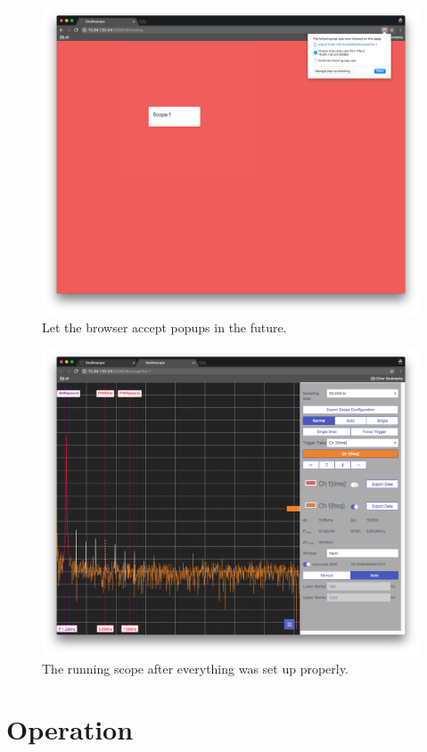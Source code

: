 \begin{figure}
    \centering
    \includegraphics[width=1\textwidth]{images/userguide/popup_yes}
    \caption[Accept popups in the future]{%
        Let the browser accept popups in the future.
    }
    \label{fig:userguide:popup:yes}
\end{figure}

\begin{figure}
    \centering
    \includegraphics[width=1\textwidth]{images/userguide/running}
    \caption[Running the scope]{%
        The running scope after everything was set up properly.
    }
    \label{fig:userguide:running}
\end{figure}

\chapter{Operation} %
\label{ch:userguide:operation}


